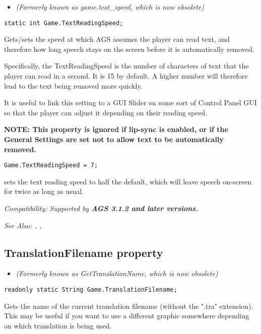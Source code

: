\begin{itemize}
\item \it{(Formerly known as game.text_speed, which is now obsolete)}
\end{itemize}

\begin{verbatim}
static int Game.TextReadingSpeed;
\end{verbatim}
Gets/sets the speed at which AGS assumes the player can read text, and therefore how
long speech stays on the screen before it is automatically removed.

Specifically, the TextReadingSpeed is the number of characters of text that the player
can read in a second. It is 15 by default. A higher number will therefore lead to the
text being removed more quickly.

It is useful to link this setting to a GUI Slider on some sort of Control Panel GUI
so that the player can adjust it depending on their reading speed.

\bf{NOTE:} This property is ignored if lip-sync is enabled, or if the General Settings
are set not to allow text to be automatically removed.

\begin{verbatim}
Game.TextReadingSpeed = 7;
\end{verbatim}
sets the text reading speed to half the default, which will leave speech on-screen
for twice as long as usual.

\it{Compatibility:} Supported by \bf{AGS 3.1.2} and later versions.

\it{See Also:} ,
,


\subsection{TranslationFilename property}\label{Game.TranslationFilename}%

\begin{itemize}
\item \it{(Formerly known as GetTranslationName, which is now obsolete)}
\end{itemize}

\begin{verbatim}
readonly static String Game.TranslationFilename;
\end{verbatim}
Gets the name of the current translation filename (without the ".tra" extension).
This may be useful if you want to use a different graphic somewhere depending on
which translation is being used.

